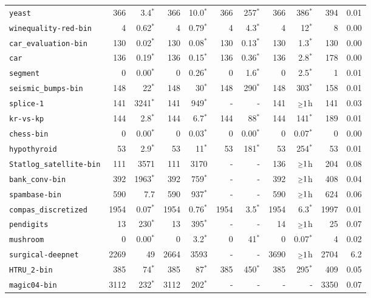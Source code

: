 \begin{tabular}{lrrrrrrrrrr}
\texttt{yeast} & 366 & 3.4$^*$ & 366 & 10.0$^*$ & 366 & 257$^*$ & 366 & 386$^*$ & 394 & 0.01\\
\texttt{winequality-red-bin} & 4 & 0.62$^*$ & 4 & 0.79$^*$ & 4 & 4.3$^*$ & 4 & 12$^*$ & 8 & 0.00\\
\texttt{car\_evaluation-bin} & 130 & 0.02$^*$ & 130 & 0.08$^*$ & 130 & 0.13$^*$ & 130 & 1.3$^*$ & 130 & 0.00\\
\texttt{car} & 136 & 0.19$^*$ & 136 & 0.15$^*$ & 136 & 0.36$^*$ & 136 & 2.8$^*$ & 178 & 0.00\\
\texttt{segment} & 0 & 0.00$^*$ & 0 & 0.26$^*$ & 0 & 1.6$^*$ & 0 & 2.5$^*$ & 1 & 0.01\\
\texttt{seismic\_bumps-bin} & 148 & 22$^*$ & 148 & 30$^*$ & 148 & 290$^*$ & 148 & 303$^*$ & 158 & 0.01\\
\texttt{splice-1} & 141 & 3241$^*$ & 141 & 949$^*$ & - & - & 141 & $\mathsmaller{\geq}1$h & 141 & 0.03\\
\texttt{kr-vs-kp} & 144 & 2.8$^*$ & 144 & 6.7$^*$ & 144 & 88$^*$ & 144 & 141$^*$ & 189 & 0.01\\
\texttt{chess-bin} & 0 & 0.00$^*$ & 0 & 0.03$^*$ & 0 & 0.00$^*$ & 0 & 0.07$^*$ & 0 & 0.00\\
\texttt{hypothyroid} & 53 & 2.9$^*$ & 53 & 11$^*$ & 53 & 181$^*$ & 53 & 254$^*$ & 53 & 0.01\\
\texttt{Statlog\_satellite-bin} & 111 & 3571 & 111 & 3170 & - & - & 136 & $\mathsmaller{\geq}1$h & 204 & 0.08\\
\texttt{bank\_conv-bin} & 392 & 1963$^*$ & 392 & 759$^*$ & - & - & 392 & $\mathsmaller{\geq}1$h & 408 & 0.04\\
\texttt{spambase-bin} & 590 & 7.7 & 590 & 937$^*$ & - & - & 590 & $\mathsmaller{\geq}1$h & 624 & 0.06\\
\texttt{compas\_discretized} & 1954 & 0.07$^*$ & 1954 & 0.76$^*$ & 1954 & 3.5$^*$ & 1954 & 6.3$^*$ & 1997 & 0.01\\
\texttt{pendigits} & 13 & 230$^*$ & 13 & 395$^*$ & - & - & 14 & $\mathsmaller{\geq}1$h & 25 & 0.07\\
\texttt{mushroom} & 0 & 0.00$^*$ & 0 & 3.2$^*$ & 0 & 41$^*$ & 0 & 0.07$^*$ & 4 & 0.02\\
\texttt{surgical-deepnet} & 2269 & 49 & 2664 & 3593 & - & - & 3690 & $\mathsmaller{\geq}1$h & 2704 & 6.2\\
\texttt{HTRU\_2-bin} & 385 & 74$^*$ & 385 & 87$^*$ & 385 & 450$^*$ & 385 & 295$^*$ & 409 & 0.05\\
\texttt{magic04-bin} & 3112 & 232$^*$ & 3112 & 202$^*$ & - & - & - & - & 3350 & 0.07\\

\end{tabular}
